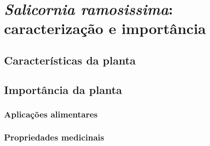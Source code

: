 
\chapter{ \textit{Salicornia ramosissima}:  caracterização e importância}



\section{Características da planta}





\section{Importância da planta}


\subsection{Aplicações alimentares}



\subsection{Propriedades medicinais}











